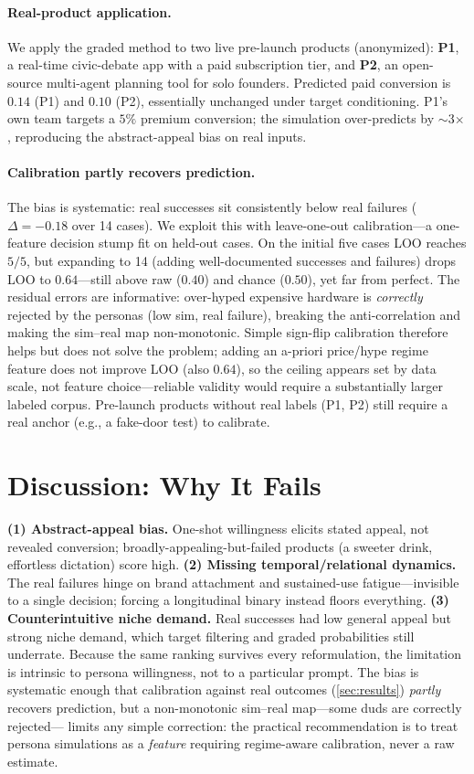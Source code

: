 \documentclass{article}
\begin{document}
\paragraph{Real-product application.} We apply the graded method to two live
pre-launch products (anonymized): \textbf{P1}, a real-time civic-debate app with a
paid subscription tier, and \textbf{P2}, an open-source multi-agent planning tool
for solo founders. Predicted paid conversion is $0.14$ (P1) and
$0.10$ (P2), essentially
unchanged under target conditioning. P1's own team targets a $5\%$ premium
conversion; the simulation over-predicts by $\sim$3$\times$, reproducing the
abstract-appeal bias on real inputs.

\paragraph{Calibration partly recovers prediction.} The bias is systematic: real
successes sit consistently below real failures ($\Delta=-0.18$ over 14 cases). We
exploit this with leave-one-out calibration---a one-feature decision stump fit on
held-out cases. On the initial five cases LOO reaches $5/5$, but expanding to 14
(adding well-documented successes and failures) drops LOO to $0.64$---still above
raw ($0.40$) and chance ($0.50$), yet far from perfect. The residual errors are
informative: over-hyped expensive hardware is \emph{correctly} rejected by the
personas (low sim, real failure), breaking the anti-correlation and making the
sim--real map non-monotonic. Simple sign-flip calibration therefore helps but does
not solve the problem; adding an a-priori price/hype regime feature does not
improve LOO (also $0.64$), so the ceiling appears set by data scale, not feature
choice---reliable validity would require a substantially larger labeled corpus.
Pre-launch products without real labels (P1, P2) still require a real anchor
(e.g., a fake-door test) to calibrate.

\section{Discussion: Why It Fails}
\label{sec:discuss}
\textbf{(1) Abstract-appeal bias.} One-shot willingness elicits stated appeal, not
revealed conversion; broadly-appealing-but-failed products (a sweeter drink,
effortless dictation) score high. \textbf{(2) Missing temporal/relational
dynamics.} The real failures hinge on brand attachment and sustained-use
fatigue---invisible to a single decision; forcing a longitudinal binary instead
floors everything. \textbf{(3) Counterintuitive niche demand.} Real successes had
low general appeal but strong niche demand, which target filtering and graded
probabilities still underrate. Because the same ranking survives every
reformulation, the limitation is intrinsic to persona willingness, not to a
particular prompt. The bias is systematic enough that
calibration against real outcomes (\cref{sec:results}) \emph{partly} recovers
prediction, but a non-monotonic sim--real map---some duds are correctly rejected---
limits any simple correction: the practical recommendation is to treat persona
simulations as a \emph{feature} requiring regime-aware calibration, never a raw
estimate.
\end{document}
